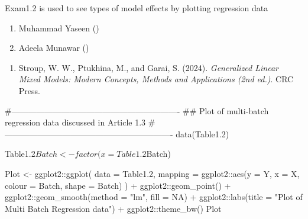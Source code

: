 \documentclass[a4paper]{book}
\begin{document}
%
\begin{Description}
Exam1.2 is used to see types of model effects by plotting regression data
\end{Description}
%
\begin{Author}
\begin{enumerate}

\item{}  Muhammad Yaseen ()
\item{} Adeela Munawar ()

\end{enumerate}

\end{Author}
%
\begin{References}
\begin{enumerate}

\item{} Stroup, W. W., Ptukhina, M., and Garai, S. (2024).
\emph{Generalized Linear Mixed Models: Modern Concepts, Methods and Applications (2nd ed.)}.
CRC Press.

\end{enumerate}

\end{References}
%
\begin{SeeAlso}
\end{SeeAlso}
%
\begin{Examples}
\begin{ExampleCode}

#-------------------------------------------------------------
## Plot of multi-batch regression data discussed in Article 1.3
#-------------------------------------------------------------
data(Table1.2)

Table1.2$Batch <- factor(x  = Table1.2$Batch)

Plot  <-
 ggplot2::ggplot(
   data = Table1.2,
   mapping = ggplot2::aes(y = Y, x = X, colour = Batch, shape = Batch)
 ) +
 ggplot2::geom_point() +
 ggplot2::geom_smooth(method = "lm", fill =  NA) +
 ggplot2::labs(title   = "Plot of Multi Batch Regression data") +
 ggplot2::theme_bw()
Plot
\end{ExampleCode}
\end{Examples}
\end{document}
